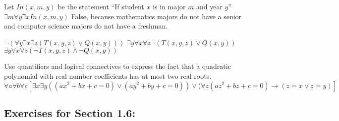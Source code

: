 \documentclass[12pt]{article}  %
\newcommand{\AND}{\wedge}
\newcommand{\OR}{\vee}
\newcommand{\IMPLIES}{\rightarrow}
\begin{document}
\newline
Let $In(x,m,y)$ be the statement ``If student $x$ is in major $m$ and year $y$''\newline
$\exists m\forall y\exists xIn(x,m,y)$\newline
False, because mathematics majors do not have a senior and computer science majors do not have a freshman.



\newline
$\neg{(\forall{y}\exists{x}\exists{z}(T(x,y,z)\lor Q(x,y)))}$\newline
$\exists{y}\forall{x}\forall{z}\neg{(T(x,y,z)\OR{Q(x,y)})}$\newline
$\exists{y}\forall{x}\forall{z}(\neg{T(x,y,z)}\AND{\neg{Q(x,y)}})$

Use quantifiers and logical connectives to express the fact that a quadratic polynomial with real number coefficients has at most two real roots.
\newline
$\forall a\forall b\forall c[\exists x\exists y((ax^2+bx+c=0)\lor(ay^2+by+c=0))\lor(\forall z(az^2+bz+c=0)\IMPLIES(z=x \lor z=y)]$

\clearpage


\subsection*{Exercises for Section 1.6:}     
\end{document}
